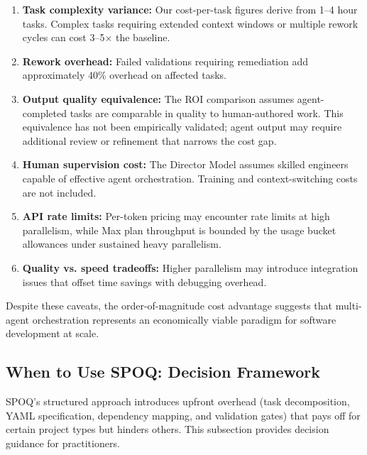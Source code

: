 \begin{enumerate}
    \item \textbf{Task complexity variance:} Our cost-per-task figures derive
    from 1--4 hour tasks. Complex tasks requiring extended context windows or
    multiple rework cycles can cost 3--5$\times$ the baseline.

    \item \textbf{Rework overhead:} Failed validations requiring remediation
    add approximately 40\% overhead on affected tasks.

    \item \textbf{Output quality equivalence:} The ROI comparison assumes
    agent-completed tasks are comparable in quality to human-authored work.
    This equivalence has not been empirically validated; agent output may
    require additional review or refinement that narrows the cost gap.

    \item \textbf{Human supervision cost:} The Director Model assumes skilled
    engineers capable of effective agent orchestration. Training and context-switching
    costs are not included.

    \item \textbf{API rate limits:} Per-token pricing may encounter rate limits
    at high parallelism, while Max plan throughput is bounded by
    the usage bucket allowances under sustained heavy parallelism.

    \item \textbf{Quality vs. speed tradeoffs:} Higher parallelism may introduce
    integration issues that offset time savings with debugging overhead.
\end{enumerate}

Despite these caveats, the order-of-magnitude cost advantage suggests that
multi-agent orchestration represents an economically viable paradigm for
software development at scale.

\needspace{6cm}
\subsection{When to Use SPOQ: Decision Framework}
\label{subsec:usage-guidance-detail}

SPOQ's structured approach introduces upfront overhead (task
decomposition, YAML specification, dependency mapping, and validation
gates) that pays off for certain project types but hinders others.
This subsection provides decision guidance for practitioners.

